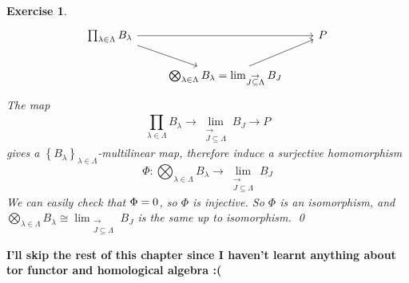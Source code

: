 \documentclass{article}
\theoremstyle{breakstyle}
\newtheorem{exercise}{Exercise}
\let\ker\relax
\DeclareMathOperator{\ker}{Ker}
\begin{document}
\begin{exercise}
    $$
\begin{tikzcd}
\prod_{\lambda \in \Lambda}B_\lambda \arrow[rr] \arrow[rd] &                                                                                                               & P \\
                                                           &     \bigotimes _{\lambda\in \Lambda}B_{\lambda}=\lim_{\substack{\rightarrow \\J\subseteq \Lambda}} B_{J} \arrow[ru] &  
\end{tikzcd}
    $$
    The map
    $$
    \prod_{\lambda\in \Lambda}^{} B_{\lambda}\longrightarrow \lim_{\substack{\rightarrow \\J\subseteq \Lambda}} B_{J} \longrightarrow P 
    $$
    gives a  $\left\{ B_{\lambda} \right\}_{\lambda\in \Lambda} $-multilinear map, therefore induce a surjective homomorphism
    $$
    \Phi:\bigotimes _{\lambda\in \Lambda}B_{\lambda}\longrightarrow \lim_{\substack{\rightarrow \\J\subseteq \Lambda}} B_{J}
    $$
    We can easily check that $\ker{\Phi}=0$, so $\Phi$ is injective.
    So $\Phi$ is an isomorphism, and $\bigotimes _{\lambda\in \Lambda}B_{\lambda}\cong \lim_{\substack{\rightarrow \\J\subseteq \Lambda}} B_{J}$ is the same up to isomorphism.
    \qed
\end{exercise}

\textbf{I'll skip the rest of this chapter since I haven't learnt anything about tor functor and homological algebra :(}
\end{document}
